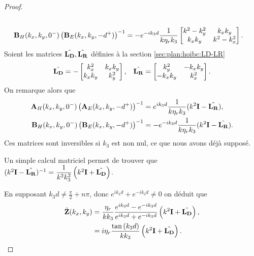 \begin{proof}
\begin{align*}
                \\
                \mathbf{B}_H(k_x,k_y,0^-)\left(\mathbf{B}_E(k_x,k_y,-d^+)\right)^{-1} &= -e^{-ik_3d}\dfrac{1}{k\eta_r k_3}
                    \begin{bmatrix}
                    k^2 - k_y^2 & k_x k_y
                    \\
                    k_x k _y & k^2 - k_x^2
                \end{bmatrix}.
            \end{align*}
            Soient les matrices \(\hat{\mathbf{L_D}},\hat{\mathbf{L_R}}\) définies à la section \ref{sec:plan:hoibc:LD-LR}
            \begin{align*}
                \hat{\mathbf{L_D}} = -\begin{bmatrix}
                k_x^2 & k_x k_y
                \\
                k_x k _y & k_y^2
                \end{bmatrix},
                & & 
                \hat{\mathbf{L_R}} = \begin{bmatrix}
                k_y^2 & -k_x k_y
                \\
                -k_x k _y &  k_x^2
                \end{bmatrix}.
            \end{align*}
            On remarque alors que 
            \begin{align*}
                \mathbf{A}_H(k_x,k_y,0^-)\left(\mathbf{A}_E(k_x,k_y,-d^+)\right)^{-1} &=  e^{ik_3d}\dfrac{1}{k\eta_r k_3}(k^2\mathbf{I}  -\hat{\mathbf{L_R}}),
                \\
                \mathbf{B}_H(k_x,k_y,0^-)\left(\mathbf{B}_E(k_x,k_y,-d^+)\right)^{-1} &= -e^{-ik_3d}\dfrac{1}{k\eta_r k_3}(k^2\mathbf{I}  -\hat{\mathbf{L_R}}).
            \end{align*}
            Ces matrices sont inversibles si \(k_3\) est non nul, ce que nous avons déjà supposé.

            Un simple calcul matriciel permet de trouver que \( (k^2\mathbf{I} - \hat{\mathbf{L_R}})^{-1} = \dfrac{1}{k^2k_3^2}\left(k^2 \mathbf{I} + \hat{\mathbf{L_D}}\right) \).

            En supposant \(k_3d \not = \frac{\pi}{2} + n\pi\), donc \(e^{ik_3d}+e^{-ik_3d}\not=0\) on déduit que
            \begin{align*}
                \hat {\mathbf{Z}}(k_x,k_y) &= \dfrac{\eta_r}{k k_3} \dfrac{e^{ik_3d} - e^{-ik_3d}}{e^{ik_3d} + e^{-ik_3d}}\left(k^2\mathbf{I} + \hat{\mathbf{L_D}}\right),
                \\
                &= i\eta_r\dfrac{\tan\left(k_3d\right)}{k k_3}\left(k^2\mathbf{I} + \hat{\mathbf{L_D}}\right).
            \end{align*}
        \end{proof}
